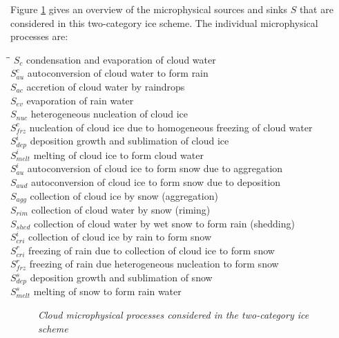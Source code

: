 Figure \ref{icescheme} gives an overview of the microphysical sources and
sinks  $S$ that are considered in this two-category ice scheme. The
individual microphysical processes are:

\begin{tabbing}
\hspace*{0.5cm}\=\hspace{1.5cm}\= \kill
\> $S_c $ \> condensation and evaporation of cloud water\\
\> $S_{au}^c$ \> autoconversion of cloud water to form rain \\
\> $S_{ac}$ \> accretion of cloud water by raindrops \\
\> $S_{ev}$ \> evaporation of rain water \\
\> $S_{nuc}$ \> heterogeneous nucleation of cloud ice \\
\> $S_{frz}^c$ \> nucleation of cloud ice due to homogeneous freezing of
cloud water\\
\> $S_{dep}^i$ \> deposition growth and sublimation of cloud ice\\
\> $S_{melt}^i$ \> melting of cloud ice to form cloud water\\
\> $S_{au}^i$ \> autoconversion of cloud ice to form snow due to aggregation\\
\> $S_{aud}$ \> autoconversion of cloud ice to form snow due to deposition\\
\> $S_{agg}$ \> collection of cloud ice by snow (aggregation)\\
\> $S_{rim}$ \> collection of cloud water by snow (riming)\\
\> $S_{shed}$ \> collection of cloud water by wet snow to form rain (shedding)\\
\> $S_{cri}^i$ \> collection of cloud ice by rain to form snow\\
\> $S_{cri}^r$ \> freezing of rain due to collection of cloud ice to form snow\\
\> $S_{frz}^r$ \> freezing of rain due heterogeneous nucleation to form snow\\
\> $S_{dep}^s$ \> deposition growth and sublimation of snow\\
\> $S_{melt}^s$ \> melting of snow to form rain water\\
\end{tabbing}

\begin{figure}[t]
\centering
\epsfxsize 11cm
\centerline{}
\caption{\it Cloud microphysical processes considered in the two-category 
ice scheme} \label{icescheme}
\end{figure}

